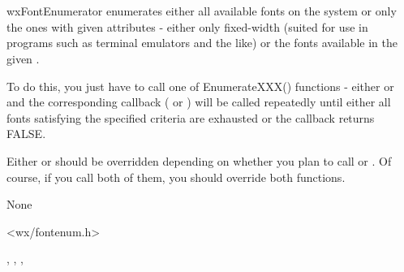 
\section{}\label{wxfontenumerator}

wxFontEnumerator enumerates either all available fonts on the system or only
the ones with given attributes - either only fixed-width (suited for use in
programs such as terminal emulators and the like) or the fonts available in
the given .

To do this, you just have to call one of EnumerateXXX() functions - either 
 or 
 and the
corresponding callback ( or 
) will be called
repeatedly until either all fonts satisfying the specified criteria are
exhausted or the callback returns FALSE.


Either  or 
 should be overridden
depending on whether you plan to call 
 or 
. Of course,
if you call both of them, you should override both functions.


None


<wx/fontenum.h>


, 
, 
, 


